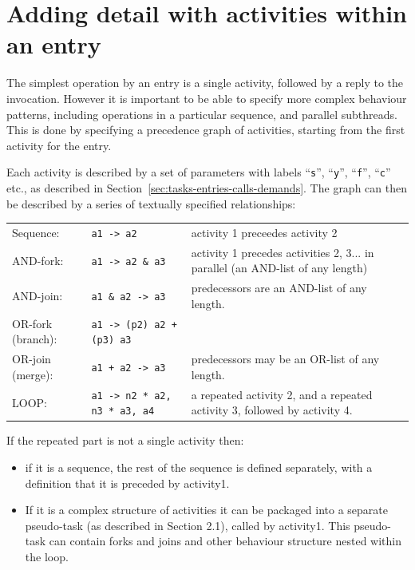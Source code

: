 \documentclass[11pt]{article}
\makeatletter
\newcommand{\parameter}[1]{\texttt{#1}\index{#1@\texttt{#1}}}
\makeatother
\begin{document}
\section{Adding detail with activities within an entry}
\label{sec:activities}
\label{sec:6}

The simplest operation by an entry is a single activity, followed by a reply to the invocation.
However it is important to be able to specify more complex behaviour patterns, including 
operations in a particular sequence, and parallel subthreads. This is done by specifying a precedence 
graph of activities, starting from the first activity for the entry.

Each activity is described by a set of parameters with labels ``\parameter{s}'', ``\parameter{y}'', ``\parameter{f}'', ``\parameter{c}'' etc., as described in
Section~\ref{sec:tasks-entries-calls-demands}. The graph can then be described by a series of textually specified relationships: 

\begin{tabular}{lp{2.5in}p{2in}}
\hline
Sequence\index{sequence}\index{->@\texttt{->}}: & \verb!a1 -> a2! & activity 1 preceedes activity 2 \\
AND-fork\index{fork!AND}\index{AND-fork}\index{->@\texttt{\&}}: & \verb!a1 -> a2 & a3! &  activity 1 precedes activities 2, 3...
in parallel (an AND-list of any length) \\
AND-join\index{join!AND}\index{AND-join}: & \verb!a1 & a2 -> a3! &  predecessors are an AND-list of any length. \\
OR-fork (branch)\index{fork!OR}\index{OR-fork}\index{branch}\index{->@\texttt{+}}: & \verb!a1 -> (p2) a2 + (p3) a3! & \\ 
OR-join (merge):\index{join!OR}\index{OR-join}\index{merge} & \verb!a1 + a2 -> a3! & predecessors may be an OR-list of any length. \\ 
LOOP\index{LOOP}\index{->@\texttt{*}}: & \verb!a1 -> n2 * a2,  n3 * a3, a4! & a repeated activity 2, and a repeated activity 3,
followed by activity 4.\\ 
\hline
\end{tabular}

If the repeated part is not a single activity then:
\begin{itemize}
\item if it is a sequence, the rest of the sequence is defined separately, with a definition that it is
  preceded by activity1.
\item If it is a complex structure of activities it can be packaged into a separate pseudo-task (as
  described in Section 2.1), called by activity1. This pseudo-task can contain forks and joins and
  other behaviour structure nested within the loop.
\end{itemize}
\end{document}
